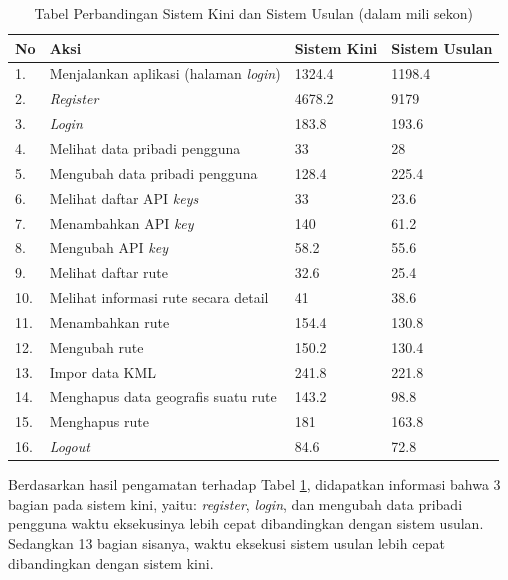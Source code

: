 \begin{table}[H]
	\centering
	\caption{Tabel Perbandingan Sistem Kini dan Sistem Usulan (dalam mili sekon)}
		\begin{tabular}{|p{0.37cm}| p{7cm}| p{2.4cm}| p{2.4cm}|} \hline
		No & Aksi & Sistem Kini & Sistem Usulan \\ \hline
		1. & Menjalankan aplikasi (halaman \textit{login}) & 1324.4 & 1198.4\\ \hline
 		2. & \textit{Register} & 4678.2 & 9179\\ \hline
		3. & \textit{Login} & 183.8 & 193.6\\ \hline
		4. & Melihat data pribadi pengguna & 33 & 28\\ \hline
		5. & Mengubah data pribadi pengguna & 128.4 & 225.4\\ \hline
		6. & Melihat daftar API \textit{keys} & 33 & 23.6\\ \hline
		7. & Menambahkan API \textit{key}& 140  & 61.2\\ \hline
		8. & Mengubah API \textit{key} & 58.2 & 55.6\\ \hline
		9. & Melihat daftar rute & 32.6 & 25.4\\ \hline
		10. & Melihat informasi rute secara detail & 41 & 38.6\\ \hline
		11. & Menambahkan rute 	& 154.4 & 130.8\\ \hline
		12. & Mengubah rute & 150.2 & 130.4\\ \hline
		13. & Impor data KML 	& 241.8 & 221.8\\ \hline
		14. & Menghapus data geografis suatu rute 	& 143.2 & 98.8\\ \hline
		15. & Menghapus rute & 181 & 163.8\\ \hline
		16. & \textit{Logout} & 84.6 & 72.8\\ \hline
		\end{tabular}
	\label{table:hasileksperimental3}
\end{table}

Berdasarkan hasil pengamatan terhadap Tabel \ref{table:hasileksperimental3}, didapatkan informasi bahwa 3 bagian pada sistem kini, yaitu: \textit{register}, \textit{login}, dan mengubah data pribadi pengguna waktu eksekusinya lebih cepat dibandingkan dengan sistem usulan. Sedangkan 13 bagian sisanya, waktu eksekusi sistem usulan lebih cepat dibandingkan dengan sistem kini.

